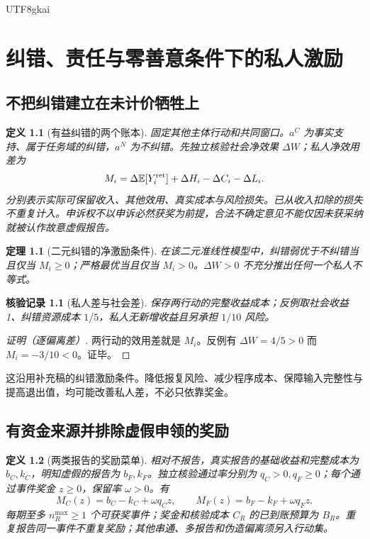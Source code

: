 \documentclass[12pt,a4paper,openany]{report}
\newtheorem{definition}{定义}[chapter]
\newtheorem{theorem}{定理}[chapter]
\newtheorem{Certificate}{核验记录}[chapter]
\newcommand{\EE}{\mathbb E}
\begin{document}
\begin{CJK*}{UTF8}{gkai}
\chapter{纠错、责任与零善意条件下的私人激励}
\label{chap:enforcement}
\section{不把纠错建立在未计价牺牲上}
\begin{definition}[有益纠错的两个账本]
\label{def:correction}
固定其他主体行动和共同窗口。$a^C$ 为事实支持、属于任务域的纠错，$a^N$ 为不纠错。先独立核验社会净效果 $\Delta W$；私人净效用差为
\[
 M_i=\Delta\EE[Y_i^{\rm ret}]+\Delta H_i-\Delta C_i-\Delta L_i.
\]
分别表示实际可保留收入、其他效用、真实成本与风险损失。已从收入扣除的损失不重复计入。申诉权不以申诉必然获奖为前提，合法不确定意见不能仅因未获采纳就被认作故意虚假报告。
\end{definition}

\begin{theorem}[二元纠错的净激励条件]
\label{thm:correction}
在该二元准线性模型中，纠错弱优于不纠错当且仅当 $M_i\ge0$；严格最优当且仅当 $M_i>0$。$\Delta W>0$ 不充分推出任何一个私人不等式。
\end{theorem}
\begin{Certificate}[私人差与社会差]
保存两行动的完整收益成本；反例取社会收益1、纠错资源成本 $1/5$，私人无新增收益且另承担 $1/10$ 风险。
\end{Certificate}
\begin{proof}[证明（逐偏离差）]
两行动的效用差就是 $M_i$。反例有 $\Delta W=4/5>0$ 而 $M_i=-3/10<0$。证毕。
\end{proof}
这沿用补充稿的纠错激励条件\cite{SourceSupplement}。降低报复风险、减少程序成本、保障输入完整性与提高退出值，均可能改善私人差，不必只依靠奖金。

\section{有资金来源并排除虚假申领的奖励}
\begin{definition}[两类报告的奖励菜单]
\label{def:report}
相对不报告，真实报告的基础收益和完整成本为 $b_C,k_C$，明知虚假的报告为 $b_F,k_F$。独立核验通过率分别为 $q_C>0,q_F\ge0$；每个通过事件奖金 $z\ge0$，保留率 $\omega>0$。有
\[
 M_C(z)=b_C-k_C+\omega q_Cz,\qquad
 M_F(z)=b_F-k_F+\omega q_Fz.
\]
每期至多 $n_R^{\max}\ge1$ 个可获奖事件；奖金和核验成本 $C_R$ 的已到账预算为 $B_R$。重复报告同一事件不重复奖励；其他串通、多报告和伪造偏离须另入行动集。
\end{definition}


\end{CJK*}
\end{document}
